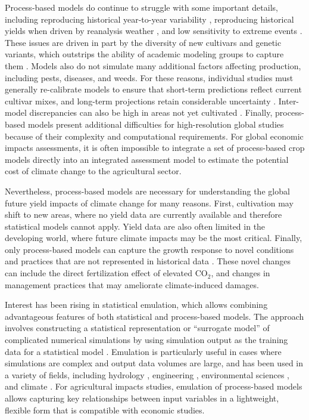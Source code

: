 \documentclass[esd, final]{copernicus} %
\begin{document}
Process-based models do continue to struggle with some important details, including reproducing historical year-to-year variability \citep[e.g.][]{muller_global_2017}, reproducing historical yields when driven by reanalysis weather \citep[e.g.][]{Glotter14}, and low sensitivity to extreme events \citep[e.g.][]{Glotter15, schewe2019}. These issues are driven in part by the diversity of new cultivars and genetic variants, which outstrips the ability of academic modeling groups to capture them \citep[e.g.][]{JONES2017b}. Models also do not simulate many additional factors affecting production, including pests, diseases, and weeds. For these reasons, individual studies must generally re-calibrate models to ensure that short-term predictions reflect current cultivar mixes, and long-term projections retain considerable uncertainty \citep{WOLF2002217, JAGTAP200273, Iizumi2010, ANGULO201332, Asseng2013, Asseng2015}. Inter-model discrepancies can also be high in areas not yet cultivated \citep[e.g.][]{Challinor2014, WHITE2011357}. Finally, process-based models present additional difficulties for high-resolution global studies because of their complexity and computational requirements. For global economic impacts assessments, it is often impossible to integrate a set of process-based crop models directly into an integrated assessment model to estimate the potential cost of climate change to the agricultural sector.

Nevertheless, process-based models are necessary for understanding the global future yield impacts of climate change for many reasons. First, cultivation may shift to new areas, where no yield data are currently available and therefore statistical models cannot apply. Yield data are also often limited in the developing world, where future climate impacts may be the most critical. Finally, only process-based models can capture the growth response to novel conditions and practices that are not represented in historical data \citep[e.g.][]{pugh_climate_2016, Roberts2017}. These novel changes can include the direct fertilization effect of elevated CO$_2$, and changes in management practices that may ameliorate climate-induced damages.

Interest has been rising in statistical emulation, which allows combining advantageous features of both statistical and process-based models. The approach involves constructing a statistical representation or ``surrogate model'' of complicated numerical simulations by using simulation output as the training data for a statistical model \citep[e.g.][]{OHAGAN2006, OHAGAN2010}. Emulation is particularly useful in cases where simulations are complex and output data volumes are large,  and  has been used in a variety of fields, including hydrology \citep[e.g.][]{Razavi2012}, engineering \citep[e.g.][]{STORLIE2009}, environmental sciences \citep[e.g.][]{RATTO2012}, and climate \citep[e.g.][]{Castruccio14, Holden2014}. For agricultural impacts studies, emulation of process-based models allows capturing key relationships between input variables in a lightweight, flexible form that is compatible with economic studies. 
\end{document}
